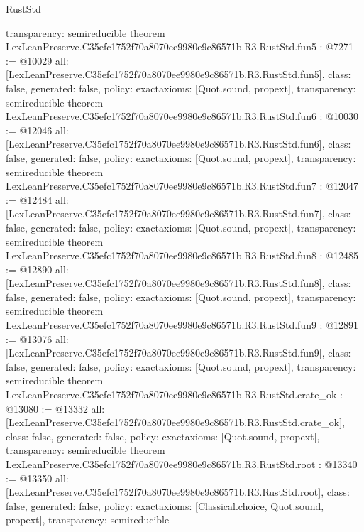 \begin{lexlean}{RustStd}
\begin{coremodule}
{  transparency: semireducible
}
theorem LexLeanPreserve.C35efc1752f70a8070ee9980e9c86571b.R3.RustStd.fun5 : @7271 := @10029 {
  all: [LexLeanPreserve.C35efc1752f70a8070ee9980e9c86571b.R3.RustStd.fun5],
  class: false,
  generated: false,
  policy: exact{axioms: [Quot.sound, propext]},
  transparency: semireducible
}
theorem LexLeanPreserve.C35efc1752f70a8070ee9980e9c86571b.R3.RustStd.fun6 : @10030 := @12046 {
  all: [LexLeanPreserve.C35efc1752f70a8070ee9980e9c86571b.R3.RustStd.fun6],
  class: false,
  generated: false,
  policy: exact{axioms: [Quot.sound, propext]},
  transparency: semireducible
}
theorem LexLeanPreserve.C35efc1752f70a8070ee9980e9c86571b.R3.RustStd.fun7 : @12047 := @12484 {
  all: [LexLeanPreserve.C35efc1752f70a8070ee9980e9c86571b.R3.RustStd.fun7],
  class: false,
  generated: false,
  policy: exact{axioms: [Quot.sound, propext]},
  transparency: semireducible
}
theorem LexLeanPreserve.C35efc1752f70a8070ee9980e9c86571b.R3.RustStd.fun8 : @12485 := @12890 {
  all: [LexLeanPreserve.C35efc1752f70a8070ee9980e9c86571b.R3.RustStd.fun8],
  class: false,
  generated: false,
  policy: exact{axioms: [Quot.sound, propext]},
  transparency: semireducible
}
theorem LexLeanPreserve.C35efc1752f70a8070ee9980e9c86571b.R3.RustStd.fun9 : @12891 := @13076 {
  all: [LexLeanPreserve.C35efc1752f70a8070ee9980e9c86571b.R3.RustStd.fun9],
  class: false,
  generated: false,
  policy: exact{axioms: [Quot.sound, propext]},
  transparency: semireducible
}
theorem LexLeanPreserve.C35efc1752f70a8070ee9980e9c86571b.R3.RustStd.crate_ok : @13080 := @13332 {
  all: [LexLeanPreserve.C35efc1752f70a8070ee9980e9c86571b.R3.RustStd.crate_ok],
  class: false,
  generated: false,
  policy: exact{axioms: [Quot.sound, propext]},
  transparency: semireducible
}
theorem LexLeanPreserve.C35efc1752f70a8070ee9980e9c86571b.R3.RustStd.root : @13340 := @13350 {
  all: [LexLeanPreserve.C35efc1752f70a8070ee9980e9c86571b.R3.RustStd.root],
  class: false,
  generated: false,
  policy: exact{axioms: [Classical.choice, Quot.sound, propext]},
  transparency: semireducible
}


\end{coremodule}
\end{lexlean}
